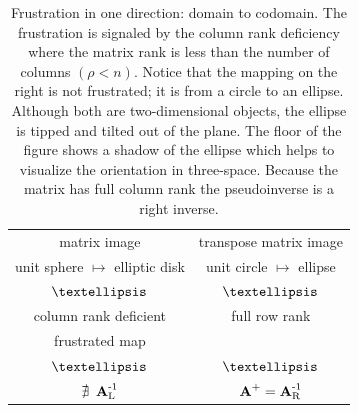 \begin{table}[htdp]
\begin{center}
\begin{tabular}{cc}
 matrix image & transpose matrix image \\
unit sphere $\mapsto$ elliptic disk & unit circle $\mapsto$ ellipse\\
 $\textellipsis$ & $\textellipsis$ \\
column rank deficient & full row rank\\
frustrated map\\
 $\textellipsis$ & $\textellipsis$ \\
 $\nexists\ \AinvL$ & $\operatorname{\textbf{A}^{\mathrm{+}}}=\operatorname{\textbf{A}^{\mathrm{-1}}_{\mathrm{R}}}$\\[10pt]
\end{tabular}
\end{center}
\label{tab:interpII:a}
\caption{Frustration in one direction: domain to codomain. The frustration is signaled by the column rank deficiency where the matrix rank is less than the number of columns $(\rho<n)$. Notice that the mapping on the right is not frustrated; it is from a circle to an ellipse. Although both are two-dimensional objects, the ellipse is tipped and tilted out of the plane. The floor of the figure shows a shadow of the ellipse which helps to visualize the orientation in three-space. Because the matrix has full column rank the pseudoinverse is a right inverse.}
\end{table}

